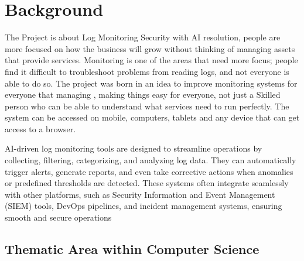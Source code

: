 \chapter{Background}
\label{chap:background}

The Project is about Log Monitoring Security with AI resolution, people are more focused on how the business will grow without thinking of managing assets that provide services. Monitoring is one of the areas that need more focus; people find it difficult to troubleshoot problems from reading logs, and not everyone is able to do so.  The project was born in an idea to improve monitoring systems for everyone that managing , making things easy for everyone, not just a Skilled person who can be able to understand what services need to run perfectly. The system can be accessed on mobile, computers, tablets and any device that can get access to a browser\cite{he2021survey}. 

AI-driven log monitoring tools are designed to streamline operations by collecting, filtering, categorizing, and analyzing log data. They can automatically trigger alerts, generate reports, and even take corrective actions when anomalies or predefined thresholds are detected. These systems often integrate seamlessly with other platforms, such as Security Information and Event Management (SIEM) tools, DevOps pipelines, and incident management systems, ensuring smooth and secure operations \cite{pratap2022real}





\section{Thematic Area within Computer Science}




